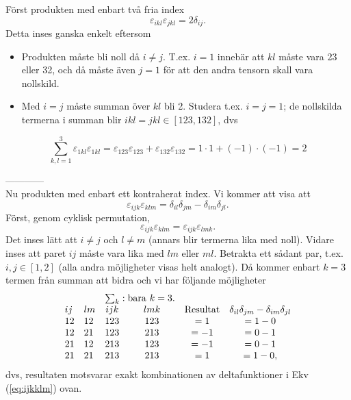 \documentclass[%
oneside,                 %
final,                   %
10pt]{article}
\newenvironment{notice_mdfboxadmon}[1][]{
\begin{notice_mdfboxmdframed}[frametitle=#1]
}
{
\end{notice_mdfboxmdframed}
}
\begin{document}
\begin{notice_mdfboxadmon}
Först produkten med enbart två fria index
\begin{equation}
  \varepsilon_{ikl} \varepsilon_{jkl} = 2 \delta_{ij}.
\end{equation}
Detta inses ganska enkelt eftersom 
\begin{itemize}
\item Produkten måste bli noll då $i \neq j$. T.ex. $i=1$ innebär att $kl$ måste vara 23 eller 32, och då måste även $j=1$ för att den andra tensorn skall vara nollskild.

\item Med $i=j$ måste summan över $kl$ bli 2. Studera t.ex. $i=j=1$; de nollskilda termerna i summan blir $ikl=jkl \in [123,132]$, dvs
\end{itemize}

\noindent
\begin{equation}
	\sum_{k,l=1}^3 \varepsilon_{1kl} \varepsilon_{1kl} = \varepsilon_{123} \varepsilon_{123} + \varepsilon_{132} \varepsilon_{132} = 1 \cdot 1 + (-1) \cdot (-1) = 2
\end{equation}


\vspace{3mm}


------------\\
Nu produkten med enbart ett kontraherat index. Vi kommer att visa att
\begin{equation}
  \label{eq:ijkklm}
  \varepsilon_{ijk} \varepsilon_{klm} = \delta_{il} \delta_{jm} - \delta_{im} \delta_{jl}.
\end{equation}
Först, genom cyklisk permutation,
\begin{equation}
  \varepsilon_{ijk} \varepsilon_{klm} = \varepsilon_{ijk} \varepsilon_{lmk} .
\end{equation}
Det inses lätt att $i \neq j$ och $l \neq m$ (annars blir termerna lika med noll). Vidare inses att paret $ij$ måste vara lika med $lm$ eller $ml$. Betrakta ett sådant par, t.ex. $i,j \in [1,2]$ (alla andra möjligheter visas helt analogt). 
Då kommer enbart $k=3$ termen från summan att bidra och vi har följande möjligheter
\begin{equation}
  \begin{array}{llcccc}
  	& & \multicolumn{2}{c}{\sum_k: \mathrm{bara~} k=3.} \\
  	ij & lm & ijk & lmk & \mathrm{Resultat} & \delta_{il}\delta_{jm}-\delta_{im}\delta_{jl}\\
  	12 & 12 & 123 & 123 & = 1 & =1-0\\
  	12 & 21 & 123 & 213 & = -1 & =0-1\\
  	21 & 12 & 213 & 123 & = -1 & =0-1\\
  	21 & 21 & 213 & 213 & = 1 & =1-0,
  \end{array}
\end{equation}
dvs, resultaten motsvarar exakt kombinationen av deltafunktioner i Ekv (\ref{eq:ijkklm}) ovan.\\
\end{notice_mdfboxadmon} %
\end{document}

